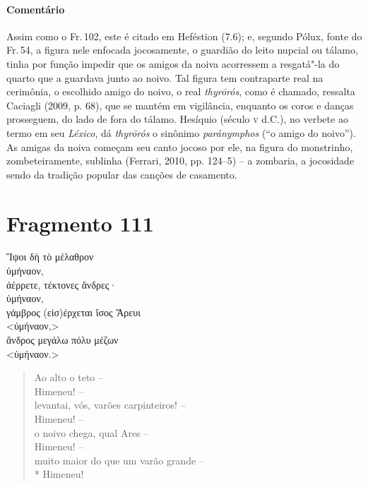 {\paragraph{Comentário} Assim como o Fr.\,102, este é citado em Heféstion (7.6); e, segundo Pólux, fonte do Fr.\,54, a figura nele enfocada jocosamente, o guardião do leito nupcial ou tálamo, 
tinha por função impedir que os amigos da noiva acorressem a resgatá"-la do
quarto que a guardava junto ao noivo.
Tal figura tem contraparte real na cerimônia, o escolhido amigo do noivo, o real \textit{thyrōrós}, como é chamado, ressalta Caciagli (2009, p. 68), que se mantém em vigilância, enquanto os coros e danças prosseguem, do lado de fora do tálamo. Hesíquio (século \textsc{v} d.C.), no verbete ao termo em seu \textit{Léxico}, dá \textit{thyrōrós} o sinônimo \textit{paránymphos} (``o amigo do noivo''). As amigas da noiva começam seu canto jocoso por ele, na figura do monstrinho, zombeteiramente, sublinha (Ferrari, 2010, pp. 124--5) -- a zombaria, a jocosidade sendo da tradição popular das canções de casamento.}


\section{Fragmento 111}

\begin{gkverse}
Ἴψοι δὴ τὸ μέλαθρον\\
ὐμήναον,\\
ἀέρρετε, τέκτονες ἄνδρες·\\
ὐμήναον,\\
γάμβρος \dagger{}(εἰσ)έρχεται ἴσος Ἄρευι\dagger{}\\
<ὐμήναον,>\\
ἄνδρος μεγάλω πόλυ μέζων\\
<ὐμήναον.>
\end{gkverse}

\begin{verse}
Ao alto o teto -- \\
Himeneu! -- \\
levantai, vós, varões carpinteiros! -- \\
Himeneu! -- \\
o noivo chega, qual Ares -- \\
Himeneu! -- \\
muito maior do que um varão grande --\\*
Himeneu!
\end{verse}

